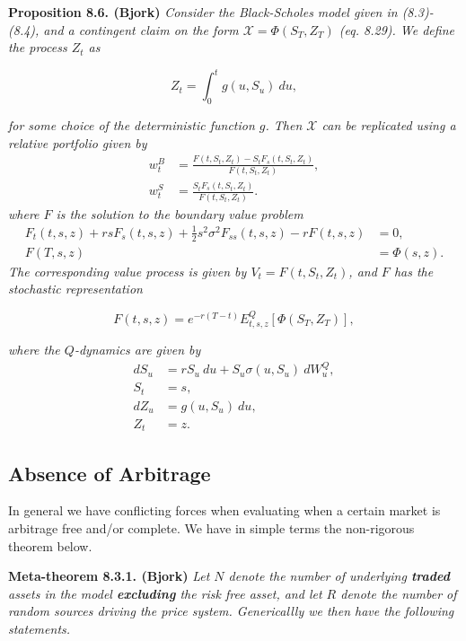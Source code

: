 \documentclass[a4paper,12pt,openany]{book}
\begin{document}
\textbf{Proposition 8.6. (Bjork)} \emph{Consider the Black-Scholes model given in (8.3)-(8.4), and a contingent claim on the form \(\mathcal{X}=\Phi(S_T,Z_T)\) (eq. 8.29). We define the process \(Z_t\) as}

\[
Z_t=\int_0^tg(u,S_u)\ du,\tag{8.30}
\]

\emph{for some choice of the deterministic function \(g\). Then \(\mathcal{X}\) can be replicated using a relative portfolio given by}
\begin{align*}
w_t^B&=\frac{F(t,S_t,Z_t)-S_tF_s(t,S_t,Z_t)}{F(t,S_t,Z_t)},\tag{8.31}\\
w_t^S&=\frac{S_tF_s(t,S_t,Z_t)}{F(t,S_t,Z_t)}.\tag{8.32}
\end{align*}
\emph{where \(F\) is the solution to the boundary value problem}
\begin{align*}
F_t(t,s,z)+rsF_s(t,s,z)+\frac{1}{2}s^2\sigma^2F_{ss}(t,s,z)-rF(t,s,z)&=0,\tag{8.33}\\
F(T,s,z)&=\Phi(s,z).\tag{8.33}
\end{align*}
\emph{The corresponding value process is given by \(V_t=F(t,S_t,Z_t)\), and \(F\) has the stochastic representation}

\[
F(t,s,z)=e^{-r(T-t)}E^Q_{t,s,z}[\Phi(S_T,Z_T)],\tag{8.34}
\]

\emph{where the \(Q\)-dynamics are given by}
\begin{align*}
dS_u&=rS_u\ du + S_u\sigma(u,S_u)\ dW^Q_u,\tag{8.35}\\
S_t&=s,\tag{8.36}\\
dZ_u&=g(u,S_u)\ du,\tag{8.37}\\
Z_t&=z.\tag{8.38}
\end{align*}

\hypertarget{absence-of-arbitrage-1}{%
\subsection{Absence of Arbitrage}\label{absence-of-arbitrage-1}}

In general we have conflicting forces when evaluating when a certain market is arbitrage free and/or complete. We have in simple terms the non-rigorous theorem below.

\textbf{Meta-theorem 8.3.1. (Bjork)} \emph{Let \(N\) denote the number of underlying \textbf{traded} assets in the model \textbf{excluding} the risk free asset, and let \(R\) denote the number of random sources driving the price system. Genericallly we then have the following statements.}
\end{document}
